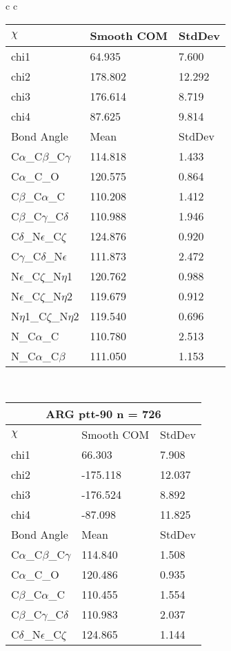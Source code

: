 \begin{longtable}{ c c }
\begin{tabular}{ l l l }
  $\chi$       & Smooth COM & StdDev \\ \midrule
  chi1 & 64.935 & 7.600 \\ 
  chi2 & 178.802 & 12.292 \\ 
  chi3 & 176.614 & 8.719 \\ 
  chi4 & 87.625 & 9.814 \\ \midrule
  Bond Angle   & Mean     & StdDev \\ \midrule
  C$\alpha$\_C$\beta$\_C$\gamma$ & 114.818 & 1.433\\
  C$\alpha$\_C\_O & 120.575 & 0.864\\
  C$\beta$\_C$\alpha$\_C & 110.208 & 1.412\\
  C$\beta$\_C$\gamma$\_C$\delta$ & 110.988 & 1.946\\
  C$\delta$\_N$\epsilon$\_C$\zeta$ & 124.876 & 0.920\\
  C$\gamma$\_C$\delta$\_N$\epsilon$ & 111.873 & 2.472\\
  N$\epsilon$\_C$\zeta$\_N$\eta$1 & 120.762 & 0.988\\
  N$\epsilon$\_C$\zeta$\_N$\eta$2 & 119.679 & 0.912\\
  N$\eta$1\_C$\zeta$\_N$\eta$2 & 119.540 & 0.696\\
  N\_C$\alpha$\_C & 110.780 & 2.513\\
  N\_C$\alpha$\_C$\beta$ & 111.050 & 1.153\\
  \bottomrule
  \end{tabular}
  \\
  \begin{tabular}{ l l l }
  \toprule
  \multicolumn{3}{c}{ARG \textbf{ptt-90} n = 726} \\ \toprule
  $\chi$       & Smooth COM & StdDev \\ \midrule
  chi1 & 66.303 & 7.908 \\ 
  chi2 & -175.118 & 12.037 \\ 
  chi3 & -176.524 & 8.892 \\ 
  chi4 & -87.098 & 11.825 \\ \midrule
  Bond Angle   & Mean     & StdDev \\ \midrule
  C$\alpha$\_C$\beta$\_C$\gamma$ & 114.840 & 1.508\\
  C$\alpha$\_C\_O & 120.486 & 0.935\\
  C$\beta$\_C$\alpha$\_C & 110.455 & 1.554\\
  C$\beta$\_C$\gamma$\_C$\delta$ & 110.983 & 2.037\\
  C$\delta$\_N$\epsilon$\_C$\zeta$ & 124.865 & 1.144\\

\end{tabular}
\end{longtable}
